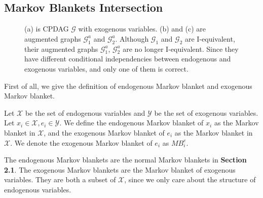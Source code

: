 \documentclass[twoside,11pt]{article}
\begin{document}
\subsection{Markov Blankets Intersection}

\begin{figure*}[htbp]
\centering

\caption{(a) is CPDAG $\mathcal G$ with exogenous variables. (b) and (c) are augmented graphs $\mathcal G^a_1$ and $\mathcal G^a_2$. Although $\mathcal G_1$ and $\mathcal G_2$ are I-equivalent, their augmented graphs $\mathcal G^a_1$, $\mathcal G^a_2$ are no longer I-equivalent. Since they have different conditional independencies between endogenous and exogenous variables, and only one of them is correct.}\label{paradox}
\end{figure*}

First of all, we give the definition of endogenous Markov blanket and exogenous Markov blanket.
\begin{definition}
Let $\mathcal X$ be the set of endogenous variables and $\mathcal Y$ be the set of exogenous variables. Let $x_i\in\mathcal X, e_i\in\mathcal Y$. We define the endogenous Markov blanket of $x_i$ as the Markov blanket in $\mathcal X$, and the exogenous Markov blanket of $e_i$ as the Markov blanket in $\mathcal X$. We denote the exogenous Markov blanket of $e_i$ as $MB^e_i$.
\end{definition}

The endogenous Markov blankets are the normal Markov blankets in \textbf{Section 2.1}. The exogenous Markov blankets are the Markov blanket of exogenous variables. They are both a subset of $\mathcal X$, since we only care about the structure of endogenous variables.
\end{document}
